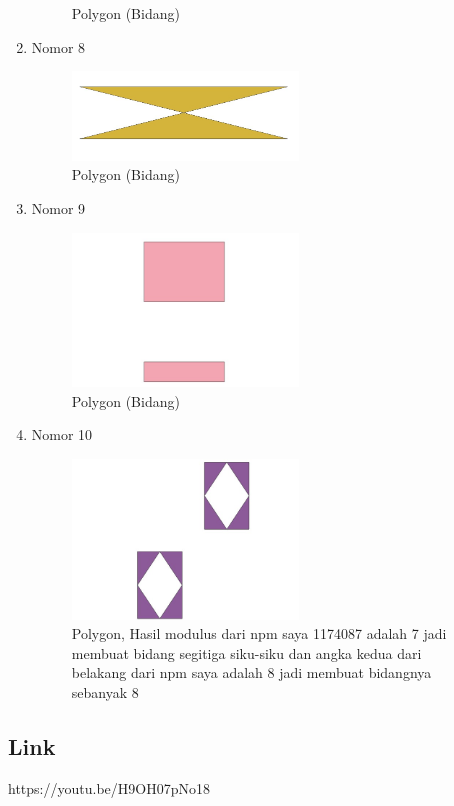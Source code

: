 \begin{enumerate}
\begin{figure}[H]
		\centering
		\caption{Polygon (Bidang)}
	\end{figure}
	\item Nomor 8
	
	\begin{figure}[H]
		\includegraphics[width=6cm]{figures/Tugas2/1174087/no8.jpg}
		\centering
		\caption{Polygon (Bidang)}
	\end{figure}
	\item Nomor 9
	
	\begin{figure}[H]
		\includegraphics[width=6cm]{figures/Tugas2/1174087/no9.jpg}
		\centering
		\caption{Polygon (Bidang)}
	\end{figure}
	\item Nomor 10
	
	\begin{figure}[H]
		\includegraphics[width=6cm]{figures/Tugas2/1174087/no10.jpg}
		\centering
		\caption{Polygon, Hasil modulus dari npm saya 1174087 adalah 7 jadi membuat bidang segitiga siku-siku dan angka kedua dari belakang dari npm saya adalah 8 jadi membuat bidangnya sebanyak 8}
	\end{figure}
\end{enumerate}
\subsection{Link}
https://youtu.be/H9OH07pNo18